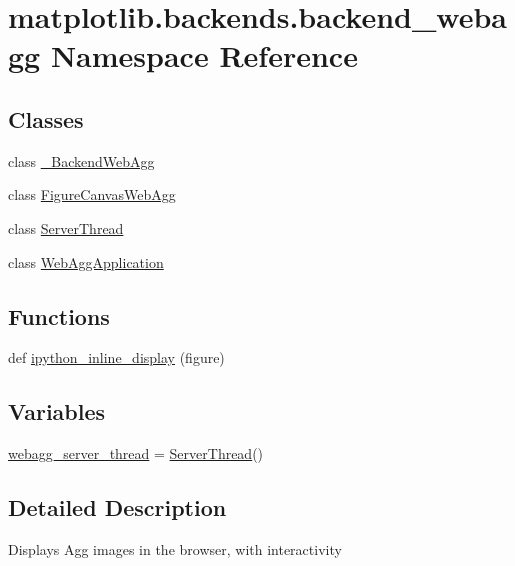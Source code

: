 \hypertarget{namespacematplotlib_1_1backends_1_1backend__webagg}{}\section{matplotlib.\+backends.\+backend\+\_\+webagg Namespace Reference}
\label{namespacematplotlib_1_1backends_1_1backend__webagg}
\subsection*{Classes}
\begin{DoxyCompactItemize}
\item 
class \hyperlink{classmatplotlib_1_1backends_1_1backend__webagg_1_1__BackendWebAgg}{\+\_\+\+Backend\+Web\+Agg}
\item 
class \hyperlink{classmatplotlib_1_1backends_1_1backend__webagg_1_1FigureCanvasWebAgg}{Figure\+Canvas\+Web\+Agg}
\item 
class \hyperlink{classmatplotlib_1_1backends_1_1backend__webagg_1_1ServerThread}{Server\+Thread}
\item 
class \hyperlink{classmatplotlib_1_1backends_1_1backend__webagg_1_1WebAggApplication}{Web\+Agg\+Application}
\end{DoxyCompactItemize}
\subsection*{Functions}
\begin{DoxyCompactItemize}
\item 
def \hyperlink{namespacematplotlib_1_1backends_1_1backend__webagg_aaa4013b0dae2bbf0864e91cab954123e}{ipython\+\_\+inline\+\_\+display} (figure)
\end{DoxyCompactItemize}
\subsection*{Variables}
\begin{DoxyCompactItemize}
\item 
\hyperlink{namespacematplotlib_1_1backends_1_1backend__webagg_a3c0f33c4460c62db793a3774f02e487b}{webagg\+\_\+server\+\_\+thread} = \hyperlink{classmatplotlib_1_1backends_1_1backend__webagg_1_1ServerThread}{Server\+Thread}()
\end{DoxyCompactItemize}


\subsection{Detailed Description}
\begin{DoxyVerb}Displays Agg images in the browser, with interactivity
\end{DoxyVerb}
 

